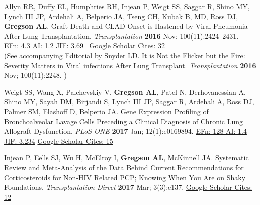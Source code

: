 \documentclass[letterpaper,10pt,sans,dvipsnames,final]{moderncv}%
\begin{document}
\begin{thebibliography}{1}
  \bibitem[33]{} Allyn RR, Duffy EL, Humphries RH, Injean P, Weigt SS, Saggar R, Shino MY, Lynch III JP, Ardehali A, Belperio JA, Tseng CH, Kubak B, MD, Ross DJ, \textbf{Gregson AL}. Graft Death and CLAD Onset is Hastened by Viral Pneumonia After Lung Transplantation. {\color{BrickRed}\textit{Transplantation}} \textbf{2016} Nov; 100(11):2424--2431. \href{http://dx.doi.org/10.1097/TP.0000000000001346}{\aiDoi}~
      {\color{NavyBlue}\href{http://52.6.43.8/projects/journalRank/rankings.php?bsearch=transplantation&searchby=journal&orderby=eigenfactor}{{\smaller EFn: 4.3 AI: 1.2}}     \href{http://admin-apps.webofknowledge.com/JCR/JCR?RQ=RECORD&rank=1&journal=TRANSPLANTATION}{{\smaller JIF: 3.69}}~
        \href{https://scholar.google.com/scholar?cites=3663977212987345650&as_sdt=2005&sciodt=0,5&hl=en}{{\smaller Google Scholar Cites: 32}}
     }
  \\(See accompanying Editorial by Snyder LD. It is Not the Flicker but the Fire: Severity Matters in Viral infections After Lung Transplant. {\color{BrickRed}\textit{Transplantation}} \textbf{2016} Nov; 100(11):2248. \href{http://journals.lww.com/transplantjournal/Citation/onlinefirst/It_Is_Not_the_Flicker_but_the_Fire___Severity.97350.aspx}{\aiDoi})

\bibitem[34]{} Weigt SS, Wang X, Palchevskiy V, \textbf{Gregson AL}, Patel N, Derhovanessian A, Shino MY, Sayah DM, Birjandi S, Lynch III JP, Saggar R, Ardehali A, Ross DJ, Palmer SM, Elashoff D, Belperio JA. Gene Expression Profiling of Bronchoalveolar Lavage Cells Preceding a Clinical Diagnosis of Chronic Lung Allograft Dysfunction. {\color{BrickRed}\textit{PLoS ONE}} \textbf{2017} Jan; 12(1):e0169894. \href{http://journals.plos.org/plosone/article?id=10.1371/journal.pone.0169894}{\aiDoi}
  {\color{NavyBlue} \href{http://admin-apps.isiknowledge.com/JCR/JCR?RQ=RECORD&rank=6&journal=PLOS+ONE}{{\smaller EFn: 128 AI: 1.4 JIF: 3.234}}
    \href{https://scholar.google.com/scholar?oi=bibs&hl=en&cites=15184190617362938115}{{\smaller Google Scholar Cites: 15}}
    }

   \bibitem[35]{} Injean P, Eells SJ, Wu H, McElroy I, \textbf{Gregson AL}, McKinnell JA. Systematic Review and Meta-Analysis of the Data Behind Current Recommendations for Corticosteroids for Non-HIV Related PCP; Knowing When You Are on Shaky Foundations. {\color{BrickRed}\textit{Transplantation Direct}} \textbf{2017} Mar; 3(3):e137. \href{http://journals.lww.com/transplantationdirect/fulltext/2017/03000/A_Systematic_Review_and_Meta_Analysis_of_the_Data.11.aspx}{\aiDoi}
     {\color{NavyBlue} \href{https://scholar.google.com/scholar?oi=bibs&hl=en&cites=13308587600576376748}{{\smaller Google Scholar Cites: 12}}
       }


\end{thebibliography}
\end{document}
